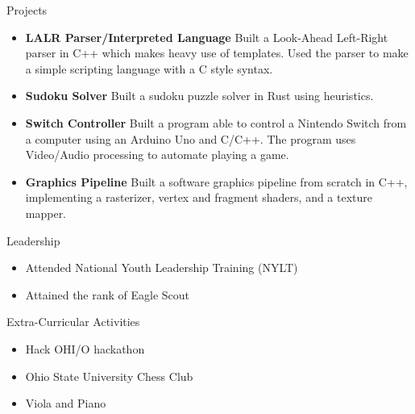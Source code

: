 \documentclass{resume}
\begin{document}
\begin{rSection}{Projects}
    \begin{itemize}
        \item \textbf{LALR Parser/Interpreted Language} Built a Look-Ahead Left-Right parser in C++ which makes heavy use of templates.
              Used the parser to make a simple scripting language with a C style syntax.
        \item \textbf{Sudoku Solver} Built a sudoku puzzle solver in Rust using heuristics.
        \item \textbf{Switch Controller} Built a program able to control a Nintendo Switch from a computer using an Arduino Uno and C/C++.
              The program uses Video/Audio processing to automate playing a game.
        \item \textbf{Graphics Pipeline} Built a software graphics pipeline from scratch in C++, implementing a rasterizer, vertex and fragment shaders, and a texture mapper.
    \end{itemize}
\end{rSection}


\begin{rSection}{Leadership}
    \begin{itemize}
        \item Attended National Youth Leadership Training (NYLT)
        \item Attained the rank of Eagle Scout
    \end{itemize}
\end{rSection}

\begin{rSection}{Extra-Curricular Activities}
    \begin{itemize}
        \item Hack OHI/O hackathon
        \item Ohio State University Chess Club
        \item Viola and Piano
    \end{itemize}
\end{rSection}
\end{document}
